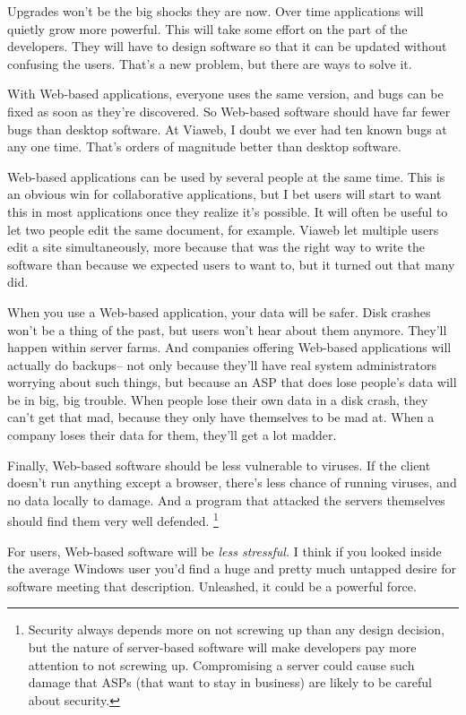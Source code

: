 \documentclass[12pt]{book}
\begin{document}
Upgrades won't be the big shocks they are now. Over time applications
will quietly grow more powerful. This will take some effort on the part
of the developers. They will have to design software so that it can be
updated without confusing the users. That's a new problem, but there are
ways to solve it.

With Web-based applications, everyone uses the same version, and bugs
can be fixed as soon as they're discovered. So Web-based software should
have far fewer bugs than desktop software. At Viaweb, I doubt we ever
had ten known bugs at any one time. That's orders of magnitude better
than desktop software.

Web-based applications can be used by several people at the same time.
This is an obvious win for collaborative applications, but I bet users
will start to want this in most applications once they realize it's
possible. It will often be useful to let two people edit the same
document, for example. Viaweb let multiple users edit a site
simultaneously, more because that was the right way to write the
software than because we expected users to want to, but it turned out
that many did.

When you use a Web-based application, your data will be safer. Disk
crashes won't be a thing of the past, but users won't hear about them
anymore. They'll happen within server farms. And companies offering
Web-based applications will actually do backups-- not only because
they'll have real system administrators worrying about such things, but
because an ASP that does lose people's data will be in big, big trouble.
When people lose their own data in a disk crash, they can't get that
mad, because they only have themselves to be mad at. When a company
loses their data for them, they'll get a lot madder.

Finally, Web-based software should be less vulnerable to viruses. If the
client doesn't run anything except a browser, there's less chance of
running viruses, and no data locally to damage. And a program that
attacked the servers themselves should find them very well defended.
\footnote{Security always depends more on not screwing up than any design
decision, but the nature of server-based software will make developers
pay more attention to not screwing up. Compromising a server could cause
such damage that ASPs (that want to stay in business) are likely to be
careful about security.}

For users, Web-based software will be \emph{less stressful.} I think if
you looked inside the average Windows user you'd find a huge and pretty
much untapped desire for software meeting that description. Unleashed,
it could be a powerful force.
\end{document}
